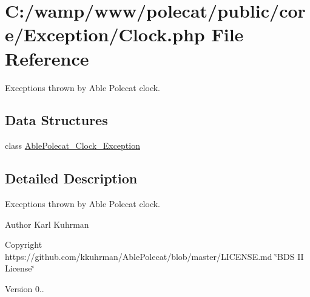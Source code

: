 \hypertarget{_exception_2_clock_8php}{}\section{C\+:/wamp/www/polecat/public/core/\+Exception/\+Clock.php File Reference}
\label{_exception_2_clock_8php}


Exceptions thrown by Able Polecat clock.  


\subsection*{Data Structures}
\begin{DoxyCompactItemize}
\item 
class \hyperlink{class_able_polecat___clock___exception}{Able\+Polecat\+\_\+\+Clock\+\_\+\+Exception}
\end{DoxyCompactItemize}


\subsection{Detailed Description}
Exceptions thrown by Able Polecat clock. 

\begin{DoxyAuthor}{Author}
Karl Kuhrman 
\end{DoxyAuthor}
\begin{DoxyCopyright}{Copyright}
https\+://github.com/kkuhrman/\+Able\+Polecat/blob/master/\+L\+I\+C\+E\+N\+S\+E.\+md \char`\"{}\+B\+D\+S I\+I License\char`\"{} 
\end{DoxyCopyright}
\begin{DoxyVersion}{Version}
0.. 
\end{DoxyVersion}
